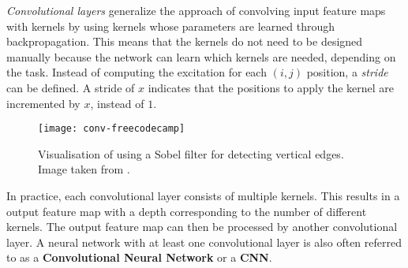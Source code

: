 \textit{Convolutional layers} generalize the approach of convolving input feature maps with kernels by using kernels whose parameters are learned through backpropagation.
This means that the kernels do not need to be designed manually because the network can learn which kernels are needed, depending on the task.
Instead of computing the excitation for each $(i,j)$ position, a \textit{stride} can be defined.
A stride of $x$ indicates that the positions to apply the kernel are incremented by $x$, instead of $1$.

\begin{figure}[htb!]
    \centering
    \texttt{[image: conv-freecodecamp]}
    \caption{Visualisation of using a Sobel filter for detecting vertical edges. Image taken from \cite{dertat_applied_2017}.}
    \label{fig:conv-vis}
\end{figure}

In practice, each convolutional layer consists of multiple kernels.
This results in a output feature map with a depth corresponding to the number of different kernels.
The output feature map can then be processed by another convolutional layer.
A neural network with at least one convolutional layer is also often referred to as a \textbf{Convolutional Neural Network} or a \textbf{CNN}.




